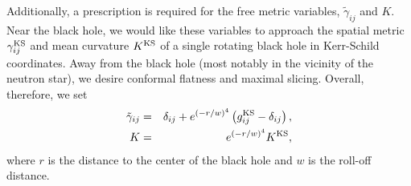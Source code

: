 Additionally, a prescription is required for the free metric
variables, $\tilde{\gamma}_{ij}$ and $K$. Near the black hole, we
would like these variables to approach the spatial metric
$\gamma_{ij}^{\rm KS}$ and mean curvature $K^{\rm KS}$ of a single
rotating black hole in Kerr-Schild coordinates. Away from the black hole (most notably in the vicinity of the neutron star), we desire conformal flatness and maximal slicing. Overall, therefore, we set 
\begin{eqnarray}
  \tilde\gamma_{ij}&=&\delta_{ij} + e^{(-r/w)^4}\left(g_{ij}^{\rm KS} -
  \delta_{ij}\right),\\ K &=& e^{(-r/w)^4} K^{\rm KS},
\end{eqnarray}
where $r$ is the distance to the center of the black hole and $w$ is the
roll-off distance.




